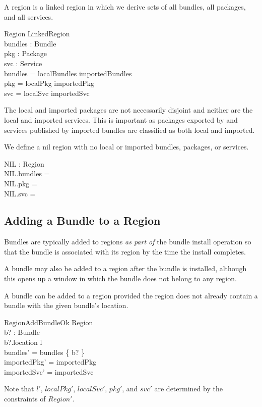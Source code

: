 \documentclass[a4paper,9pt,twoside]{article}
\begin{document}
A region is a linked region in which we derive sets of all bundles, all packages, and all services.
\begin{schema}{Region}
  LinkedRegion \\
  bundles : \power Bundle \\
  pkg : \power Package \\
  svc : \power Service \\
\where
  bundles = localBundles \cup importedBundles \\
  pkg = localPkg \cup importedPkg \\
  svc = localSvc \cup importedSvc \\
\end{schema}
The local and imported packages are not necessarily disjoint and neither are the local and imported
services. This is important as packages exported by and services published by imported bundles
are classified as both local and imported.

We define a nil region with no local or imported bundles, packages, or services.
\begin{axdef}
  NIL : Region \\
\where
 NIL.bundles = \emptyset \\
 NIL.pkg = \emptyset \\
 NIL.svc = \emptyset \\
 \end{axdef}

\subsection{Adding a Bundle to a Region}

Bundles are typically added to regions \textit{as part of} the bundle install operation
so that the bundle is associated with its region by the time the
install completes.

A bundle may also be added to a region after the bundle is installed, although this opens up a window in
which the bundle does not belong to any region.

A bundle can be added to a region provided the region does not already contain a bundle with
the given bundle's location.
\begin{schema}{RegionAddBundleOk}
  \Delta Region \\
  b? : Bundle \\
\where
  b?.location \notin \dom l \\
  bundles' = bundles \cup \{ b? \} \\
  importedPkg' = importedPkg \\
  importedSvc' = importedSvc \\
\end{schema}
Note that $l'$, $localPkg'$, $localSvc'$, $pkg'$, and $svc'$ are determined by the constraints of $Region'$.
\end{document}
